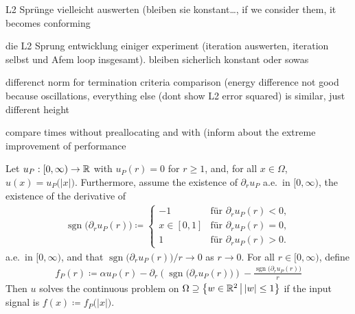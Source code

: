 
\begin{frame}
  L2 Sprünge vielleicht auswerten (bleiben sie konstant\ldots, if we consider
  them, it becomes conforming

  die L2 Sprung entwicklung einiger experiment (iteration auswerten, iteration 
  selbst und Afem loop insgesamt). bleiben sicherlich konstant oder sowas
\end{frame}

\begin{frame}
  differenct norm for termination criteria comparison (energy difference not
  good because oscillations, everything else (dont show L2 error squared)
  is similar, just different height
\end{frame}

\begin{frame}
  compare times without preallocating and with (inform about the extreme 
  improvement of performance
\end{frame}

\begin{frame}
  Let $u_P:[0,\infty)\to\mathbb{R}$ with $u_P(r)=0$ for $r\geq 1$,
  and, for all $x\in\Omega$, $u(x)= u_P\big(|x|\big)$. 
  \pause
  Furthermore, assume the existence  of $\partial_r u_P$ a.e.\ in $[0,\infty)$,
  the existence of the derivative of
  \begin{align*}
    \operatorname{sgn}\big(\partial_r u_P(r)\big)
    \coloneqq
    \begin{cases}
      -1 &\text{für }\partial_r u_P(r)<0,\\
      x\in[0,1] &\text{für }\partial_r u_P(r)=0,\\ 
      1 &\text{für }\partial_r u_P(r)>0.
    \end{cases}
  \end{align*}
  a.e.\ in $[0,\infty)$, and
  that $\operatorname{sgn}\big(\partial_r u_P(r)\big)/r\to 0$ as $r\to 0$.
  \pause
  For all $r\in[0,\infty)$, define 
  \begin{align*}
    f_P(r)
    \coloneqq 
    \alpha u_P(r) - \partial_r\left(\operatorname{sgn}\big(\partial_r u_P(r)\big)\right) 
    - \frac{\operatorname{sgn}\big(\partial_r u_P(r)\big)}{r}
  \end{align*}
  \pause
  Then $u$ solves the continuous problem
  on $\Omega\supseteq \left\{w\in\mathbb{R}^2\,\middle|\, |w|\leq 1\right\}$ if
  the input signal is $f(x)\coloneqq f_P\big(|x|\big)$.
\end{frame}
